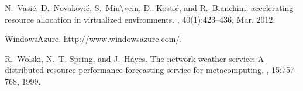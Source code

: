 \documentclass{sig-alternate-10pt}
\begin{document}
\begin{thebibliography}{10}
N.~Vasić, D.~Novaković, S.~Miu{\textbackslash}vcin, D.~Kostić, and
  R.~Bianchini.
 accelerating resource allocation in virtualized
  environments.
, 40(1):423--436, Mar. 2012.

{WindowsAzure. http://www.windowsazure.com/}.

R.~Wolski, N.~T. Spring, and J.~Hayes.
\newblock The network weather service: A distributed resource performance
  forecasting service for metacomputing.
, 15:757--768,
  1999.

\end{thebibliography}
\end{document}
